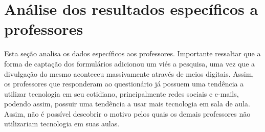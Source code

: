 


\section{Análise dos resultados específicos a professores}

Esta seção analisa os dados específicos aos professores. Importante ressaltar que a forma de captação dos formulários adicionou um viés a pesquisa, uma vez que a divulgação do mesmo aconteceu massivamente através de meios digitais.  Assim, os professores que responderam ao questionário já possuem uma tendência a utilizar tecnologia em seu cotidiano, principalmente redes sociais e e-mails, podendo assim, possuir uma tendência a usar mais tecnologia em sala de aula. Assim, não é possível descobrir o motivo pelos quais os demais professores não utilizariam tecnologia em suas aulas.

